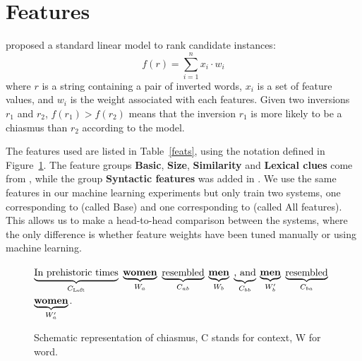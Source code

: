 \documentclass[11pt]{article}
\newcommand{\mn}[1]{\textbf{#1}}
\begin{document}
\section{Features}
 proposed a standard linear model to rank candidate instances:
\begin{displaymath}
f(r)=\sum\limits_{i=1}^n x_i \cdot w_i
\end{displaymath}
where $r$ is a string containing a pair of inverted words, $x_i$ is a set of feature values, and $w_i$ is the weight associated with each features. Given two inversions $r_1$ and $r_2$, $f(r_1) > f(r_2)$ means that the inversion $r_1$ is more likely to be a chiasmus than $r_2$ according to the model.

The features used are listed in Table~\ref{feats}, using the notation defined in Figure~\ref{formalism}. The feature groups \textbf{Basic}, \textbf{Size}, \textbf{Similarity} and \textbf{Lexical clues} come from , while the group \textbf{Syntactic features} was added in . We use the same features in our machine learning experiments but only 
train two systems, one corresponding to  (called Base) %
and one corresponding to  (called All features). %
This allows us to make a head-to-head comparison between the systems, where the only difference is whether feature weights have been tuned manually or using machine learning.

\label{append}
\begin{figure}[t]
\footnotesize
\begin{center}
{$\underbrace{\hbox{In prehistoric times}}_{C_{\text{Left}}}$ 
$\underbrace{\hbox{\hbox{\mn{women}}}}_{W_a}$ 
$\underbrace{\hbox{resembled}}_{C_{ab}}$ 
$\underbrace{\hbox{\mn{men}}}_{W_b}$ 
$\underbrace{\hbox{, and}}_{C_{bb}}$
$\underbrace{\hbox{\mn{men}}}_{W'_b}$ 
$\underbrace{\hbox{resembled}}_{C_{ba}}$
$\underbrace{\hbox{\mn{women}}}_{W'_a}$.}
\caption{\label{formalism}Schematic representation of chiasmus, C stands for context, W for word.}%
\end{center}
\end{figure}
\end{document}

